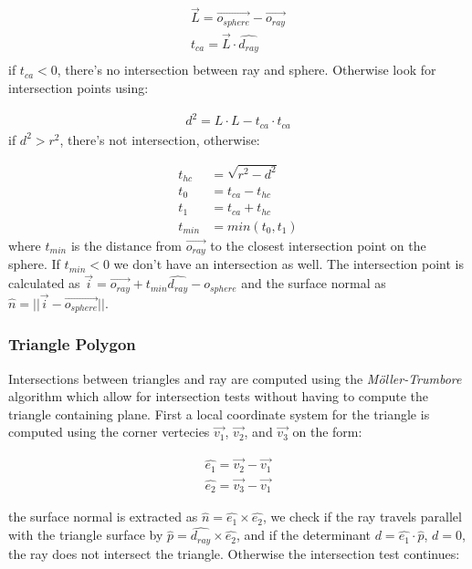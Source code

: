 \documentclass[a4paper, twocolumn]{article}
\begin{document}
        \begin{align*}
            \vec{L} = \vec{o_{sphere}} - \vec{o_{ray}} \\
            t_{ca} = \vec{L} \cdot  \hat{d_{ray}} \\
        \end{align*}
        if \(t_{ca} < 0\), there's no intersection between ray and sphere. Otherwise look for intersection points using:
        
        \begin{align*}
            d^2 = L \cdot L - t_{ca} \cdot t_{ca}
        \end{align*}
        if \(d^2 > r^2\), there's not intersection, otherwise:

        \begin{align*}
            t_{hc} &= \sqrt{r^2 - d^2} \\
            t_0 &= t_{ca} - t_{hc} \\
            t_1 &= t_{ca} + t_{hc} \\
            t_{min} &= min(t_0, t_1)
        \end{align*}
        where \(t_{min}\) is the distance from \(\vec{o_{ray}}\) to the closest intersection point on the sphere. If \(t_{min}  < 0\) we don't have an intersection as well. The intersection point is calculated as  \(\vec{i} = \vec{o_{ray}} + t_{min} \hat{d_{ray}} - o_{sphere} \) and the surface normal as \( \hat{n} = || \vec{i} - \vec{o_{sphere}} || \).

        \subsubsection{Triangle Polygon} \label{sec:triangle_polygon}
        
        Intersections between triangles and ray are computed using the \textit{Möller-Trumbore}~\cite{moller2005fast} algorithm which allow for intersection tests without having to compute the triangle containing plane. First a local coordinate system for the triangle is computed using the corner vertecies \(\vec{v_1}\), \(\vec{v_2}\), and \(\vec{v_3}\) on the form:

\begin{align*}
    \hat{e_1} = \vec{v_2} - \vec{v_1} \\
    \hat{e_2} = \vec{v_3} - \vec{v_1}
\end{align*}

the surface normal is extracted as \( \hat{n} =\hat{e_1} \times \hat{e_2} \), we check if the ray travels parallel with the triangle surface by \(\hat{p} = \hat{d_{ray}} \times \hat{e_2}\), and if the determinant  \(d = \hat{e_1} \cdot \hat{p}\), \(d = 0 \), the ray does not intersect the triangle. Otherwise the intersection test continues:
\end{document}
